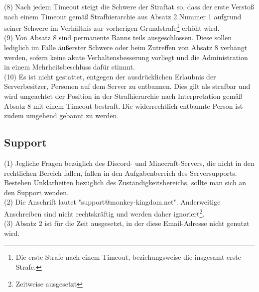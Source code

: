 \documentclass{article}
\begin{document}
(8) Nach jedem Timeout steigt die Schwere der Straftat so, dass der erste Verstoß nach einem Timeout gemäß Strafhierarchie aus Absatz 2 Nummer 1  aufgrund seiner Schwere im Verhältnis zur vorherigen Grundstrafe\footnote{Die erste Strafe nach einem Timeout, beziehungsweise die insgesamt erste Strafe.} erhöht wird.\\
(9) Von Absatz 8 sind permanente Banns teils ausgeschlossen. Diese sollen lediglich im Falle äußerster Schwere oder beim Zutreffen von Absatz 8 verhängt werden, sofern keine akute Verhaltensbesserung vorliegt und die Administration in einem Mehrheitsbeschluss dafür stimmt.\\
(10) Es ist nicht gestattet, entgegen der ausdrücklichen Erlaubnis der Serverbesitzer, Personen auf dem Server zu entbannen. Dies gilt als strafbar und wird ungeachtet der Position in der Strafhierarchie nach Interpretation gemäß Absatz 8 mit einem Timeout bestraft. Die widerrechtlich entbannte Person ist zudem umgehend gebannt zu werden.

\subsection{Support}\label{support}
(1) Jegliche Fragen bezüglich des Discord- und Minecraft-Servers, die nicht in den rechtlichen Bereich fallen, fallen in den Aufgabenbereich des Serversupports. Bestehen Unklarheiten bezüglich des Zuständigkeitsbereichs, sollte man sich an den Support wenden.\\
(2) Die Anschrift lautet "support@monkey-kingdom.net". Anderweitige Anschreiben sind nicht rechtskräftig und werden daher ignoriert\footnote{Zeitweise ausgesetzt}.\\
(3) Absatz 2 ist für die Zeit ausgesetzt, in der diese Email-Adresse nicht genutzt wird.
\end{document}
